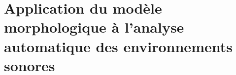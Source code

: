 \chapter{Application du modèle morphologique à l’analyse automatique des environnements sonores}\label{ch:ml_xp}







